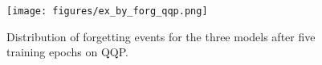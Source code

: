 \begin{figure}[t]
\centering
  \texttt{[image: figures/ex\_by\_forg\_qqp.png]}
  \caption{Distribution of forgetting events for the three models after five training epochs on QQP. }
\label{fig:forgcount-freq-qqp}
\end{figure}